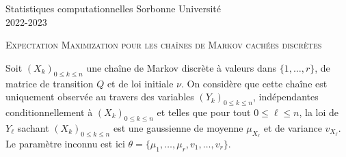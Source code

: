 \documentclass[a4paper,10pt,fleqn]{article}
\newcommand{\1}{\ensuremath{\mathbbm{1}}}
\begin{document}
\noindent Statistiques computationnelles \hfill Sorbonne Universit\'e \\
 2022-2023

\noindent\hrulefill

\begin{center}
\textsc{Expectation Maximization pour les cha\^ines de Markov cach\'ees discr\`etes}
\end{center}
\hrulefill

\medskip


Soit $(X_k)_{0\leq k\leq n}$ une cha\^ine de Markov discr\`ete \`a valeurs dans $\{1,\ldots,r\}$, de matrice de transition $Q$ et de loi initiale $\nu$. On consid\`ere que cette cha\^ine est uniquement observ\'ee au travers des variables $(Y_k)_{0\leq k\leq n}$, ind\'ependantes conditionnellement \`a $(X_k)_{0\leq k\leq n}$ et telles que pour tout $0\leq \ell\leq n$, la loi de $Y_\ell$ sachant $(X_k)_{0\leq k\leq n}$ est une gaussienne de moyenne $\mu_{X_\ell}$ et de variance $v_{X_\ell}$.
Le param\`etre inconnu est ici $\theta= \{\mu_1,\ldots,\mu_r,v_1,\ldots,v_r\}$.
\end{document}
